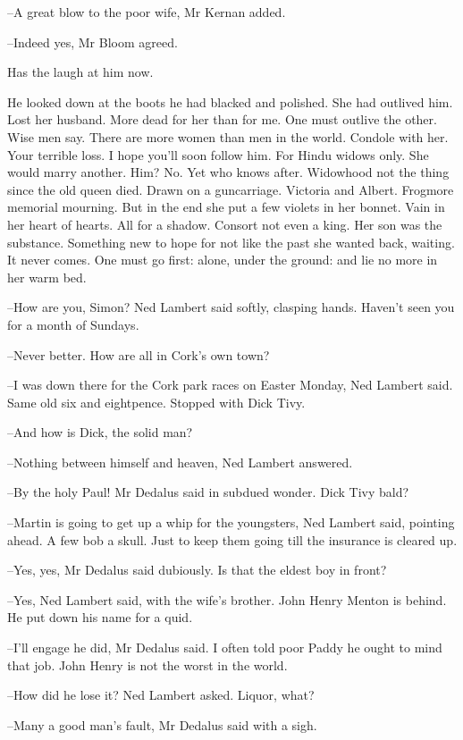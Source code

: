 --A great blow to the poor wife,
Mr Kernan added.

--Indeed yes,
Mr Bloom agreed.

Has the laugh at him now.

He looked down at the boots he had blacked and polished.
She had outlived him.
Lost her husband.
More dead for her than for me.
One must outlive the other.
Wise men say.
There are more women than men in the world.
Condole with her.
Your terrible loss.
I hope you'll soon follow him.
For Hindu widows only.
She would marry another.
Him?
No.
Yet who knows after.
Widowhood not the thing since the old queen died.
Drawn on a guncarriage.
Victoria and Albert.
Frogmore memorial mourning.
But in the end she put a few violets in her bonnet.
Vain in her heart of hearts.
All for a shadow.
Consort not even a king.
Her son was the substance.
Something new to hope for not like the past she wanted back, waiting.
It never comes.
One must go first:
alone, under the ground:
and lie no more in her warm bed.

--How are you, Simon?
Ned Lambert said softly,
clasping hands.
Haven't seen you for a month of Sundays.

--Never better.
How are all in Cork's own town?

--I was down there for the Cork park races on Easter Monday,
Ned Lambert said.
Same old six and eightpence.
Stopped with Dick Tivy.

--And how is Dick, the solid man?

--Nothing between himself and heaven,
Ned Lambert answered.

--By the holy Paul!
Mr Dedalus said in subdued wonder.
Dick Tivy bald?

--Martin is going to get up a whip for the youngsters,
Ned Lambert said, pointing ahead.
A few bob a skull.
Just to keep them going till the insurance is cleared up.

--Yes, yes,
Mr Dedalus said dubiously.
Is that the eldest boy in front?

--Yes,
Ned Lambert said,
with the wife's brother.
John Henry Menton is behind.
He put down his name for a quid.

--I'll engage he did,
Mr Dedalus said.
I often told poor Paddy he ought to mind that job.
John Henry is not the worst in the world.

--How did he lose it?
Ned Lambert asked.
Liquor, what?

--Many a good man's fault,
Mr Dedalus said with a sigh.

